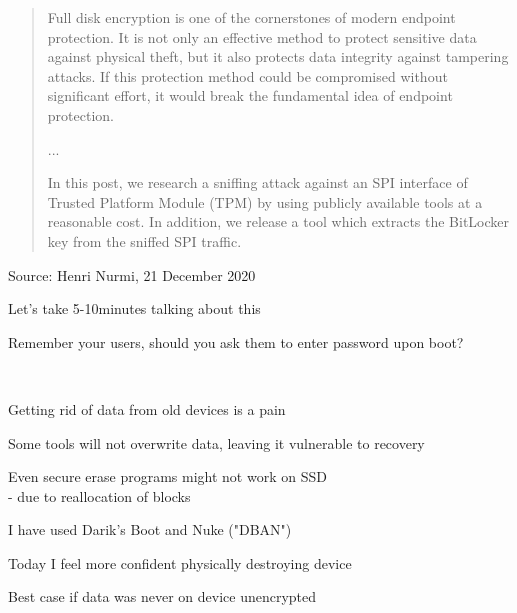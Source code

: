 \documentclass[Screen16to9,17pt]{foils}
\begin{document}

\begin{quote}\small
Full disk encryption is one of the cornerstones of modern endpoint protection. It is not only an effective method to protect sensitive data against physical theft, but it also protects data integrity against tampering attacks. If this protection method could be compromised without significant effort, it would break the fundamental idea of endpoint protection.

...

In this post, we research a sniffing attack against an SPI interface of Trusted Platform Module (TPM) by using publicly available tools at a reasonable cost. In addition, we release a tool which extracts the BitLocker key from the sniffed SPI traffic.
\end{quote}
Source: Henri Nurmi, 21 December 2020\\

\begin{list2}
\item Let's take 5-10minutes talking about this
\item Remember your users, should you ask them to enter password upon boot?
\end{list2}



{~}

\begin{list1}
\item Getting rid of data from old devices is a pain
\item Some tools will not overwrite data, leaving it vulnerable to recovery
\item Even secure erase programs might not work on SSD\\
 - due to reallocation of blocks
\item I have used Darik's Boot and Nuke ("DBAN")\\
\item Today I feel more confident physically destroying device
\item Best case if data was never on device unencrypted
\end{list1}





\end{document}
